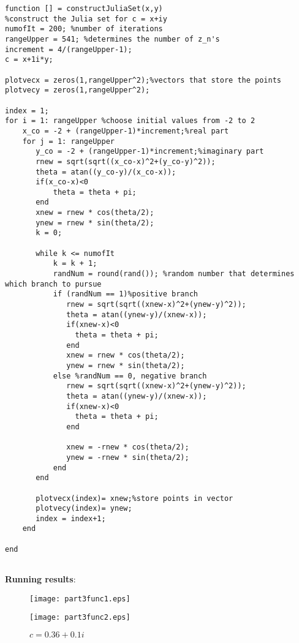 \documentclass[11pt]{article}
\begin{document}
\begin{lstlisting}
function [] = constructJuliaSet(x,y)
%construct the Julia set for c = x+iy
numofIt = 200; %number of iterations
rangeUpper = 541; %determines the number of z_n's
increment = 4/(rangeUpper-1);
c = x+1i*y;

plotvecx = zeros(1,rangeUpper^2);%vectors that store the points
plotvecy = zeros(1,rangeUpper^2);

index = 1;
for i = 1: rangeUpper %choose initial values from -2 to 2
    x_co = -2 + (rangeUpper-1)*increment;%real part
    for j = 1: rangeUpper 
       y_co = -2 + (rangeUpper-1)*increment;%imaginary part 
       rnew = sqrt(sqrt((x_co-x)^2+(y_co-y)^2));
       theta = atan((y_co-y)/(x_co-x));
       if(x_co-x)<0
           theta = theta + pi;
       end
       xnew = rnew * cos(theta/2);
       ynew = rnew * sin(theta/2);
       k = 0;

       while k <= numofIt
           k = k + 1;
           randNum = round(rand()); %random number that determines which branch to pursue
           if (randNum == 1)%positive branch
              rnew = sqrt(sqrt((xnew-x)^2+(ynew-y)^2));
              theta = atan((ynew-y)/(xnew-x));
              if(xnew-x)<0
                theta = theta + pi;
              end
              xnew = rnew * cos(theta/2);
              ynew = rnew * sin(theta/2);
           else %randNum == 0, negative branch
              rnew = sqrt(sqrt((xnew-x)^2+(ynew-y)^2));
              theta = atan((ynew-y)/(xnew-x));
              if(xnew-x)<0
                theta = theta + pi;
              end
              
              xnew = -rnew * cos(theta/2);
              ynew = -rnew * sin(theta/2);
           end
       end

       plotvecx(index)= xnew;%store points in vector
       plotvecy(index)= ynew;
       index = index+1;
    end
    
end


\end{lstlisting}

\textbf{Running results}: \\
\begin{figure}[H]
  \centering
  \begin{minipage}[b]{0.45\textwidth}
    \texttt{[image: part3func1.eps]}
    \caption{$c = 0$}
  \end{minipage}
  \hfill
  \begin{minipage}[b]{0.45\textwidth}
    \texttt{[image: part3func2.eps]}
    \caption{$c = 0.36 +  0.1i$}
  \end{minipage}
   \end{figure}
   
\end{document}
